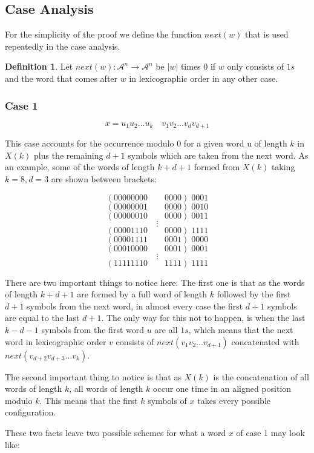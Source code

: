 \documentclass[11pt,a4paper]{tesis}
\theoremstyle{definition}
\newtheorem{definition}{Definition}[section]
\begin{document}
\subsection{Case Analysis}
For the simplicity of the proof we define the function $next(w)$ that is used repeatedly in the case analysis.

\begin{definition}
    Let $next(w):\mathcal{A}^n \rightarrow \mathcal{A}^n $ be $|w|$ times 0 if $w$ only consists of $1s$ and the word that comes after $w$ in lexicographic order in any other case.
\end{definition}

\subsubsection{Case 1}
$$x = u_1 u_2 \dots u_k \quad v_1 v_2 \dots v_{d} v_{d + 1}$$

This case accounts for the occurrence modulo 0 for a given word u of length $k$ in $X(k)$ plus the remaining $d + 1$ symbols which are taken from the next word.
As an example, some of the words of length $k + d + 1$ formed from $X(k)$ taking $k = 8, d = 3$ are shown between brackets:

$$( 00000000 \qquad 0000 ) \; 0001$$
$$( 00000001 \qquad 0000 ) \; 0010$$
$$( 00000010 \qquad 0000 ) \; 0011$$
$$\vdots$$
$$( 00001110 \qquad 0000 ) \; 1111$$
$$( 00001111 \qquad 0001 ) \; 0000$$
$$( 00010000 \qquad 0001 ) \; 0001$$
$$\vdots$$
$$( 11111110 \qquad 1111 ) \; 1111$$

There are two important things to notice here. The first one is that as the words of length $k + d + 1$ are formed by a full word of length $k$ followed by the first $d + 1$ symbols from the next word, in almost every case the first $d + 1$ symbols are equal to the last $d + 1$.
The only way for this not to happen, is when the last $k - d - 1$ symbols from the first word $u$ are all $1s$, which means that the next word in lexicographic order $v$ consists of $next(v_1 v_2 \dots v_{d + 1})$ concatenated with $next(v_{d + 2} v_{d + 3} \dots v_{k})$.

The second important thing to notice is that as $X(k)$ is the concatenation of all words of length $k$, all words of length $k$ occur one time in an aligned position modulo $k$. This means that the first $k$ symbols of $x$ takes every possible configuration. 

These two facts leave two possible schemes for what a word $x$ of case 1 may look like:
\end{document}
